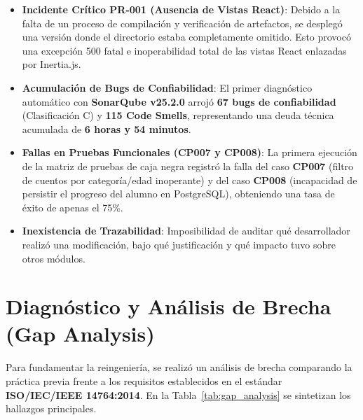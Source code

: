 \documentclass[12pt]{article}
\begin{document}
\begin{itemize}
    \item \textbf{Incidente Crítico PR-001 (Ausencia de Vistas React)}: Debido a la falta de un proceso de compilación y verificación de artefactos, se desplegó una versión donde el directorio  estaba completamente omitido. Esto provocó una excepción 500 fatal e inoperabilidad total de las vistas React enlazadas por Inertia.js.
    \item \textbf{Acumulación de Bugs de Confiabilidad}: El primer diagnóstico automático con \textbf{SonarQube v25.2.0} arrojó \textbf{67 bugs de confiabilidad} (Clasificación C) y \textbf{115 Code Smells}, representando una deuda técnica acumulada de \textbf{6 horas y 54 minutos}.
    \item \textbf{Fallas en Pruebas Funcionales (CP007 y CP008)}: La primera ejecución de la matriz de pruebas de caja negra registró la falla del caso \textbf{CP007} (filtro de cuentos por categoría/edad inoperante) y del caso \textbf{CP008} (incapacidad de persistir el progreso del alumno en PostgreSQL), obteniendo una tasa de éxito de apenas el 75\%.
    \item \textbf{Inexistencia de Trazabilidad}: Imposibilidad de auditar qué desarrollador realizó una modificación, bajo qué justificación y qué impacto tuvo sobre otros módulos.
\end{itemize}

\section{Diagnóstico y Análisis de Brecha (Gap Analysis)}

Para fundamentar la reingeniería, se realizó un análisis de brecha comparando la práctica previa frente a los requisitos establecidos en el estándar \textbf{ISO/IEC/IEEE 14764:2014}. En la Tabla~\ref{tab:gap_analysis} se sintetizan los hallazgos principales.
\end{document}
